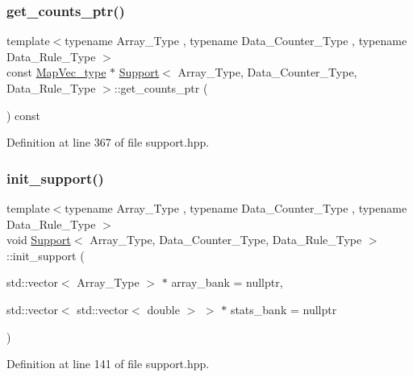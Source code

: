 \subsubsection{\texorpdfstring{get\+\_\+counts\+\_\+ptr()}{get\_counts\_ptr()}}
{\footnotesize\ttfamily template$<$typename Array\+\_\+\+Type , typename Data\+\_\+\+Counter\+\_\+\+Type , typename Data\+\_\+\+Rule\+\_\+\+Type $>$ \\
const \hyperlink{typedefs_8hpp_a02ed8dec96bc528c8bc3d8cb3c4674a5}{Map\+Vec\+\_\+type} $\ast$ \hyperlink{class_support}{Support}$<$ Array\+\_\+\+Type, Data\+\_\+\+Counter\+\_\+\+Type, Data\+\_\+\+Rule\+\_\+\+Type $>$\+::get\+\_\+counts\+\_\+ptr (\begin{DoxyParamCaption}{ }\end{DoxyParamCaption}) const\hspace{0.3cm}{\ttfamily [inline]}}



Definition at line 367 of file support.\+hpp.

\mbox{\label{class_support_a013872a55ffd6a0a931e124da8e8dc99}} 
\subsubsection{\texorpdfstring{init\+\_\+support()}{init\_support()}}
{\footnotesize\ttfamily template$<$typename Array\+\_\+\+Type , typename Data\+\_\+\+Counter\+\_\+\+Type , typename Data\+\_\+\+Rule\+\_\+\+Type $>$ \\
void \hyperlink{class_support}{Support}$<$ Array\+\_\+\+Type, Data\+\_\+\+Counter\+\_\+\+Type, Data\+\_\+\+Rule\+\_\+\+Type $>$\+::init\+\_\+support (\begin{DoxyParamCaption}\item[{std\+::vector$<$ Array\+\_\+\+Type $>$ $\ast$}]{array\+\_\+bank = {\ttfamily nullptr},  }\item[{std\+::vector$<$ std\+::vector$<$ double $>$ $>$ $\ast$}]{stats\+\_\+bank = {\ttfamily nullptr} }\end{DoxyParamCaption})\hspace{0.3cm}{\ttfamily [inline]}}



Definition at line 141 of file support.\+hpp.

\mbox{\label{class_support_af87b2e85ec72e394387946023508e7fd}} 
